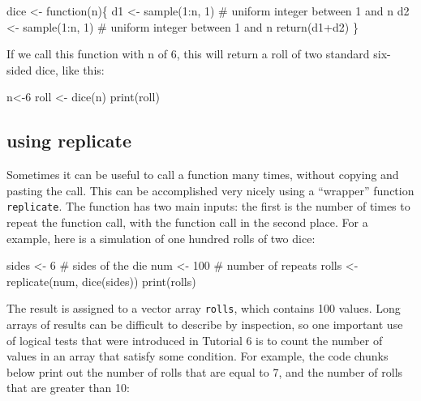 \documentclass[
  letterpaper,
  DIV=11,
  numbers=noendperiod]{scrreprt}
\newenvironment{Shaded}{\begin{snugshade}}{\end{snugshade}}
\newcommand{\NormalTok}[1]{\textcolor[rgb]{0.00,0.23,0.31}{#1}}
\begin{document}
\begin{Shaded}
\begin{Highlighting}[]
\NormalTok{dice \textless{}{-} function(n)\{ }
\NormalTok{  d1 \textless{}{-} sample(1:n, 1) \# uniform integer between 1 and n}
\NormalTok{  d2 \textless{}{-} sample(1:n, 1) \# uniform integer between 1 and n}
\NormalTok{  return(d1+d2)}
\NormalTok{\}}
\end{Highlighting}
\end{Shaded}

If we call this function with n of 6, this will return a roll of two
standard six-sided dice, like this:

\begin{Shaded}
\begin{Highlighting}[]
\NormalTok{n\textless{}{-}6}
\NormalTok{roll \textless{}{-} dice(n)}
\NormalTok{print(roll)}
\end{Highlighting}
\end{Shaded}

\hypertarget{using-replicate}{%
\subsection*{using replicate}\label{using-replicate}}

Sometimes it can be useful to call a function many times, without
copying and pasting the call. This can be accomplished very nicely using
a ``wrapper'' function \texttt{replicate}. The function has two main
inputs: the first is the number of times to repeat the function call,
with the function call in the second place. For a example, here is a
simulation of one hundred rolls of two dice:

\begin{Shaded}
\begin{Highlighting}[]
\NormalTok{sides \textless{}{-} 6 \# sides of the die}
\NormalTok{num \textless{}{-} 100 \# number of repeats}
\NormalTok{rolls \textless{}{-} replicate(num, dice(sides))}
\NormalTok{print(rolls)}
\end{Highlighting}
\end{Shaded}

The result is assigned to a vector array \texttt{rolls}, which contains
100 values. Long arrays of results can be difficult to describe by
inspection, so one important use of logical tests that were introduced
in Tutorial 6 is to count the number of values in an array that satisfy
some condition. For example, the code chunks below print out the number
of rolls that are equal to 7, and the number of rolls that are greater
than 10:
\end{document}
